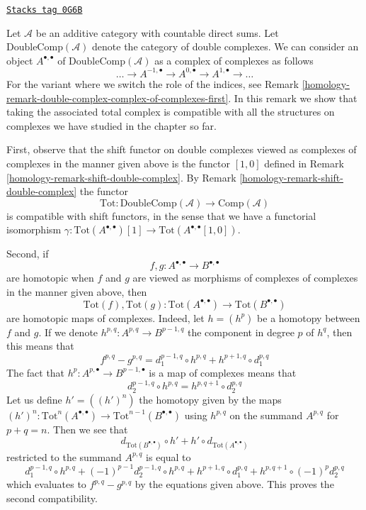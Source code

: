 \begin{remark}
\label{homology-remark-double-complex-complex-of-complexes-second}
\href{https://stacks.math.columbia.edu/tag/0G6B}{\texttt{Stacks tag 0G6B}}

Let $\mathcal{A}$ be an additive category with countable direct sums.
Let $\text{DoubleComp}(\mathcal{A})$ denote the category of double complexes.
We can consider an object $A^{\bullet, \bullet}$ of
$\text{DoubleComp}(\mathcal{A})$ as a complex of complexes
as follows
$$
\ldots \to A^{-1, \bullet} \to A^{0, \bullet} \to A^{1, \bullet} \to \ldots
$$
For the variant where we switch the role of the indices, see
Remark \ref{homology-remark-double-complex-complex-of-complexes-first}.
In this remark we show that taking the associated total complex
is compatible with all the structures on complexes we have studied
in the chapter so far.

\medskip\noindent
First, observe that the shift functor on double complexes viewed
as complexes of complexes in the manner given above is the functor
$[1, 0]$ defined in Remark \ref{homology-remark-shift-double-complex}.
By Remark \ref{homology-remark-shift-double-complex} the functor
$$
\text{Tot} : \text{DoubleComp}(\mathcal{A}) \to \text{Comp}(\mathcal{A})
$$
is compatible with shift functors, in the sense that we have a functorial
isomorphism $\gamma : \text{Tot}(A^{\bullet, \bullet})[1] \to
\text{Tot}(A^{\bullet, \bullet}[1, 0])$.

\medskip\noindent
Second, if
$$
f, g : A^{\bullet, \bullet} \to B^{\bullet, \bullet}
$$
are homotopic when $f$ and $g$ are viewed as morphisms of complexes
of complexes in the manner given above, then
$$
\text{Tot}(f), \text{Tot}(g) :
\text{Tot}(A^{\bullet, \bullet}) \to \text{Tot}(B^{\bullet, \bullet})
$$
are homotopic maps of complexes. Indeed, let $h = (h^p)$
be a homotopy between $f$ and $g$. If we denote
$h^{p, q} : A^{p, q} \to B^{p - 1, q}$ the component in degree $p$ of $h^q$,
then this means that
$$
f^{p, q} - g^{p, q} = d_1^{p - 1, q} \circ h^{p, q} +
h^{p + 1, q} \circ d_1^{p, q}
$$
The fact that $h^p : A^{p, \bullet} \to B^{p - 1, \bullet}$ is a map of
complexes means that
$$
d_2^{p - 1, q} \circ h^{p, q} = h^{p, q + 1} \circ d_2^{p, q}
$$
Let us define $h' = ((h')^n)$ the homotopy given by the maps
$(h')^n : \text{Tot}^n(A^{\bullet, \bullet}) \to
\text{Tot}^{n - 1}(B^{\bullet, \bullet})$
using $h^{p, q}$ on the summand $A^{p, q}$ for $p + q = n$.
Then we see that
$$
d_{\text{Tot}(B^{\bullet, \bullet})} \circ h' +
h' \circ d_{\text{Tot}(A^{\bullet, \bullet})}
$$
restricted to the summand $A^{p, q}$ is equal to
$$
d_1^{p - 1, q} \circ h^{p, q} +
(-1)^{p - 1} d_2^{p - 1, q} \circ h^{p, q} +
h^{p + 1, q} \circ d_1^{p, q} +
h^{p, q + 1} \circ (-1)^p d_2^{p, q}
$$
which evaluates to $f^{p, q} - g^{p, q}$ by the equations given above.
This proves the second compatibility.


\end{remark}
